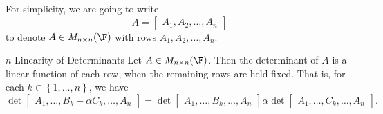 \documentclass[linearalgebraI]{subfiles}
\begin{document}
    \begin{remark}
        For simplicity, we are going to write
        \begin{equation*}
            A = \begin{bmatrix} A_1, A_2, \ldots, A_n \end{bmatrix}
        \end{equation*}
        to denote $A\in M_{n\times n}(\F)$ with rows $A_1, A_2, \ldots, A_n$.
    \end{remark}

    \begin{prop}{$n$-Linearity of Determinants}
        Let $A\in M_{n\times n}(\F)$. Then the determinant of $A$ is a linear function of each row, when the remaining rows are held fixed. That is, for each $k\in \left\lbrace 1, \ldots, n \right\rbrace$, we have
        \begin{equation*}
            \det 
            \begin{bmatrix}
                A_1, \ldots, B_k + \alpha C_k, \ldots, A_n
            \end{bmatrix}
            =
            \det 
            \begin{bmatrix}
                A_1, \ldots,  B_k, \ldots, A_n
            \end{bmatrix}
            \alpha \det 
            \begin{bmatrix}
                A_1, \ldots, C_k, \ldots, A_n
            \end{bmatrix}.
        \end{equation*}
    \end{prop}
\end{document}
